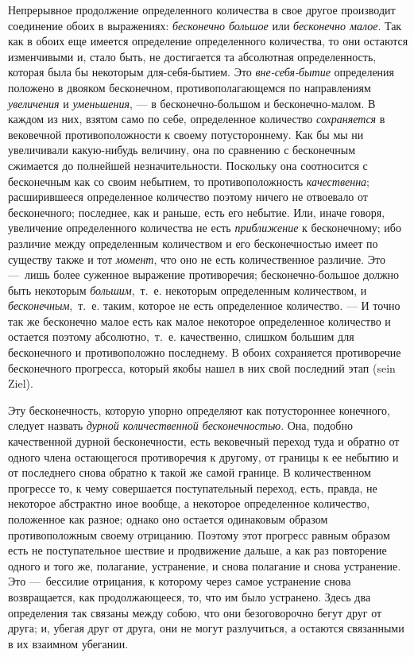 Непрерывное продолжение определенного количества в свое другое производит
соединение обоих в выражениях: {\em бесконечно большое}
или {\em бесконечно малое}. Так как в обоих еще имеется
определение определенного количества, то они остаются изменчивыми и, стало
быть, не достигается та абсолютная определенность, которая была бы
некоторым для-себя-бытием. Это {\em вне-себя-бытие}
определения положено в двояком бесконечном, противополагающемся по
направлениям {\em увеличения} и
{\em уменьшения}, — в бесконечно-большом и
бесконечно-малом. В каждом из них, взятом само по себе, определенное
количество {\em сохраняется} в вековечной
противоположности к своему потустороннему. Как бы мы ни увеличивали
какую-нибудь величину, она по сравнению с бесконечным сжимается до
полнейшей незначительности. Поскольку она соотносится с бесконечным как со
своим небытием, то противоположность {\em качественна};
расширившееся определенное количество поэтому ничего не отвоевало от
бесконечного; последнее, как и раньше, есть его небытие. Или, иначе говоря,
увеличение определенного количества не есть
{\em приближение} к бесконечному; ибо различие между
определенным количеством и его бесконечностью имеет по существу также и тот
{\em момент}, что оно не есть количественное различие.
Это —~лишь более суженное выражение противоречия; бесконечно-большое должно
быть некоторым {\em большим},~т.~е. некоторым
определенным количеством, и {\em бесконечным},~т.~е.
таким, которое не есть определенное количество. — И точно так же бесконечно
малое есть как малое некоторое определенное количество и остается поэтому
абсолютно,~т.~е. качественно, слишком большим для бесконечного и
противоположно последнему. В обоих сохраняется противоречие бесконечного
прогресса, который якобы нашел в них свой последний этап (sein Ziel).

Эту бесконечность, которую упорно определяют как потустороннее конечного,
следует назвать {\em дурной количественной
бесконечностью}. Она, подобно качественной дурной бесконечности, есть
вековечный переход туда и обратно от одного члена остающегося противоречия
к другому, от границы к ее небытию и от последнего снова обратно к такой же
самой границе. В количественном прогрессе то, к чему совершается
поступательный переход, есть, правда, не некоторое абстрактно иное
вообще, а некоторое определенное количество, положенное как разное; однако
оно остается одинаковым образом противоположным своему отрицанию. Поэтому
этот прогресс равным образом есть не поступательное шествие и продвижение
дальше, а как раз повторение одного и того же, полагание, устранение, и
снова полагание и снова устранение. Это —~бессилие отрицания, к которому
через самое устранение снова возвращается, как продолжающееся, то, что им
было устранено. Здесь два определения так связаны между собою, что они
безоговорочно бегут друг от друга; и, убегая друг от друга, они не могут
разлучиться, а остаются связанными в их взаимном убегании.


